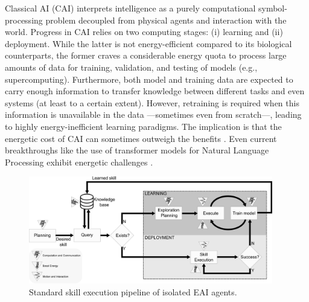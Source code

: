 \documentclass[12pt]{article}
\begin{document}
Classical AI (CAI) interprets intelligence as a purely computational symbol-processing problem decoupled from physical agents and interaction with the world. Progress in CAI relies on two computing stages: (i) learning and (ii) deployment. While the latter is not energy-efficient compared to its biological counterparts, the former craves a considerable energy quota to process large amounts of data for training, validation, and testing of models (e.g., supercomputing). Furthermore, both model and training data are expected to carry enough information to transfer knowledge between different tasks and even systems (at least to a certain extent). However, retraining is required when this information is unavailable in the data ---sometimes even from scratch---, leading to highly energy-inefficient learning paradigms. The implication is that the energetic cost of CAI can sometimes outweigh the benefits \cite{Strubell2019EnergyPolicyConsiderations}. Even current breakthroughs like the use of transformer models for Natural Language Processing exhibit energetic challenges \cite{Cao2020TowardsAccurateReliable}.
\begin{figure}[!t]
	\centering
	\includegraphics[width=0.95\textwidth]{fig/embodied_ai_learning_pipeline_v7.png}
	\caption{Standard skill execution pipeline of isolated EAI agents.}
	\label{fig:embodied_ai_pipeline}
\end{figure}
\end{document}
